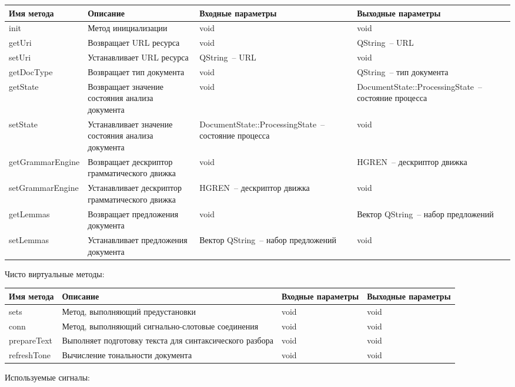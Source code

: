 \documentclass[a4paper,14pt,russian]{extreport}
\begin{document}
\begin{longtable}{|m{3 cm}|m{3 cm}|m{4 cm}|m{4 cm}|}
\hline
Имя метода & Описание & Входные параметры & Выходные параметры \\
\hline
init & Метод инициализации & void & void \\
\hline
getUri & Возвращает URL ресурса & void & QString~-- URL \\
\hline
setUri & Устанавливает URL ресурса & QString~-- URL & void \\
\hline
{get\-Doc\-Type} & Возвращает тип документа & void & QString~-- тип документа \\
\hline
{get\-State} & Возвращает значение состояния анализа документа & void & {Document\-State::\-Processing\-State}~-- состояние процесса \\
\hline
{set\-State} & Устанавливает значение состояния анализа документа & {Document\-State::\-Processing\-State}~-- состояние процесса & void \\
\hline
{get\-Grammar\-Engine} & Возвращает дескриптор грамматического движка & void & HGREN~-- дескриптор движка \\
\hline
{set\-Grammar\-Engine} & Устанавливает дескриптор грамматического движка & HGREN~-- дескриптор движка & void \\
\hline
{get\-Lemmas} & Возвращает предложения документа & void & Вектор QString~-- набор предложений \\
\hline
{set\-Lemmas} & Устанавливает предложения документа & Вектор QString~-- набор предложений & void \\
\hline
\end{longtable}

Чисто виртуальные методы:

\begin{longtable}{|m{3 cm}|m{3 cm}|m{4 cm}|m{4 cm}|}
\hline
Имя метода & Описание & Входные параметры & Выходные параметры \\
\hline
sets & Метод, выполняющий предустановки & void & void \\
\hline
conn & Метод, выполняющий сигнально-слотовые соединения & void & void \\
\hline
{prepare\-Text} & Выполняет подготовку текста для синтаксического разбора & void & void \\
\hline
{refresh\-Tone} & Вычисление тональности документа & void & void \\
\hline
\end{longtable}

Используемые сигналы:
\end{document}
